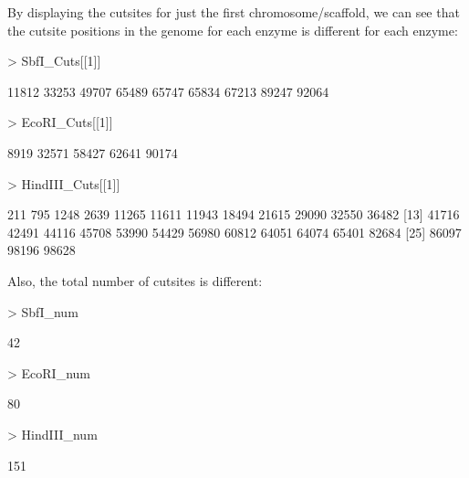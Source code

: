 \documentclass{article}
\begin{document}
By displaying the cutsites for just the first chromosome/scaffold, we can see that the cutsite positions in the genome for each enzyme is different for each enzyme:
\begin{Schunk}
\begin{Sinput}
> SbfI_Cuts[[1]]
\end{Sinput}
\begin{Soutput}
[1] 11812 33253 49707 65489 65747 65834 67213 89247 92064
\end{Soutput}
\begin{Sinput}
> EcoRI_Cuts[[1]]
\end{Sinput}
\begin{Soutput}
[1]  8919 32571 58427 62641 90174
\end{Soutput}
\begin{Sinput}
> HindIII_Cuts[[1]]
\end{Sinput}
\begin{Soutput}
 [1]   211   795  1248  2639 11265 11611 11943 18494 21615 29090 32550 36482
[13] 41716 42491 44116 45708 53990 54429 56980 60812 64051 64074 65401 82684
[25] 86097 98196 98628
\end{Soutput}
\end{Schunk}

Also, the total number of cutsites is different:
\begin{Schunk}
\begin{Sinput}
> SbfI_num
\end{Sinput}
\begin{Soutput}
[1] 42
\end{Soutput}
\begin{Sinput}
> EcoRI_num
\end{Sinput}
\begin{Soutput}
[1] 80
\end{Soutput}
\begin{Sinput}
> HindIII_num
\end{Sinput}
\begin{Soutput}
[1] 151
\end{Soutput}
\end{Schunk}
\end{document}
